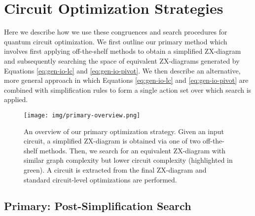 \section{Circuit Optimization Strategies}

Here we describe how we use these congruences and search procedures for quantum circuit optimization.
We first outline our primary method which involves first applying off-the-shelf methods to obtain a simplified ZX-diagram and subsequently searching the space of equivalent ZX-diagrams generated by Equations \ref{eq:gen-io-lc} and \ref{eq:gen-io-pivot}.
We then describe an alternative, more general approach in which Equations \ref{eq:gen-io-lc} and \ref{eq:gen-io-pivot} are combined with simplification rules to form a single action set over which search is applied.


\begin{figure}[t]
\centering
\texttt{[image: img/primary-overview.png]}
\caption{
  An overview of our primary optimization strategy.
  Given an input circuit, a simplified ZX-diagram is obtained via one of two off-the-shelf methods.
  Then, we search for an equivalent ZX-diagram with similar graph complexity but lower circuit complexity (highlighted in green).
  A circuit is extracted from the final ZX-diagram and standard circuit-level optimizations are performed.
}
\label{fig:primary}
\end{figure}

\subsection{Primary: Post-Simplification Search}\label{sec:primary}

